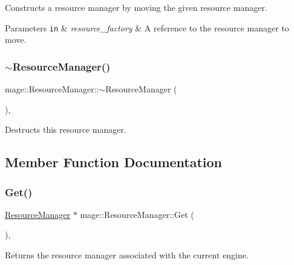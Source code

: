 Constructs a resource manager by moving the given resource manager.


\begin{DoxyParams}[1]{Parameters}
\mbox{\tt in}  & {\em resource\+\_\+factory} & A reference to the resource manager to move. \\
\hline
\end{DoxyParams}
\hypertarget{classmage_1_1_resource_manager_ad4bed85d3656f90072c5d47f50618add}{}\label{classmage_1_1_resource_manager_ad4bed85d3656f90072c5d47f50618add} 
\subsubsection{\texorpdfstring{$\sim$\+Resource\+Manager()}{~ResourceManager()}}
{\footnotesize\ttfamily mage\+::\+Resource\+Manager\+::$\sim$\+Resource\+Manager (\begin{DoxyParamCaption}{ }\end{DoxyParamCaption})\hspace{0.3cm}{\ttfamily [virtual]}, {\ttfamily [default]}}

Destructs this resource manager. 

\subsection{Member Function Documentation}
\hypertarget{classmage_1_1_resource_manager_a1e6ca77d892578fc4df0e62dfbc807f6}{}\label{classmage_1_1_resource_manager_a1e6ca77d892578fc4df0e62dfbc807f6} 
\subsubsection{\texorpdfstring{Get()}{Get()}}
{\footnotesize\ttfamily \hyperlink{classmage_1_1_resource_manager}{Resource\+Manager} $\ast$ mage\+::\+Resource\+Manager\+::\+Get (\begin{DoxyParamCaption}{ }\end{DoxyParamCaption})\hspace{0.3cm}{\ttfamily [static]}, {\ttfamily [noexcept]}}

Returns the resource manager associated with the current engine.

